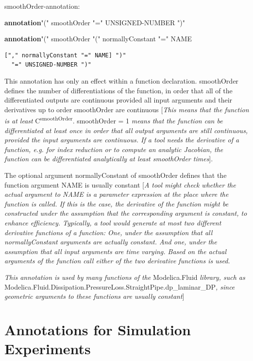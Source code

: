 \documentclass[10pt,a4paper]{report}
\def\doublelabel#1{\label{#1}\hypertarget{#1}{}}
\begin{document}
smoothOrder-annotation:

\textbf{annotation}"(" smoothOrder "=" UNSIGNED-NUMBER ")" \textbar{}

\textbf{annotation}"(" smoothOrder "(" normallyConstant "=" NAME

\begin{lstlisting}[language=modelica]
  ["," normallyConstant "=" NAME] ")"
  "=" UNSIGNED-NUMBER ")"
\end{lstlisting}
This annotation has only an effect within a function declaration.
smoothOrder defines the number of differentiations of the function, in
order that all of the differentiated outputs are continuous provided all
input arguments and their derivatives up to order smoothOrder are
continuous {[}\emph{This means that the function is at least}
C\textsuperscript{smoothOrder}. smoothOrder = 1 \emph{means that the
function can be differentiated at least once in order that all output
arguments are still continuous, provided the input arguments are
continuous. If a tool needs the derivative of a function, e.g. for index
reduction or to compute an analytic Jacobian, the function can be
differentiated analytically at least smoothOrder times}{]}.

The optional argument normallyConstant of smoothOrder defines that the
function argument NAME is usually constant {[}\emph{A tool might check
whether the actual argument to NAME is a parameter expression at the
place where the function is called. If this is the case, the derivative
of the function might be constructed under the assumption that the
corresponding argument is constant, to enhance efficiency. Typically, a
tool would generate at most two different derivative functions of a
function: One, under the assumption that all normallyConstant arguments
are actually constant. And one, under the assumption that all input
arguments are time varying. Based on the actual arguments of the
function call either of the two derivative functions is used.}

\emph{This annotation is used by many functions of the} Modelica.Fluid
\emph{library, such as}
Modelica.Fluid.Dissipation.PressureLoss.StraightPipe.dp\_laminar\_DP\emph{,
since geometric arguments to these functions are usually constant}{]}

\section{Annotations for Simulation Experiments}\doublelabel{annotations-for-simulation-experiments}
\end{document}
